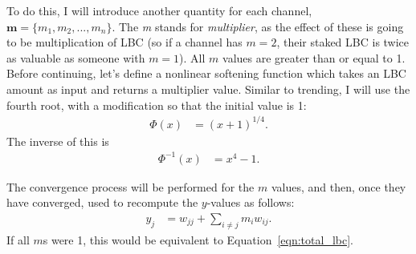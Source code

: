 \documentclass[a4paper, 12pt]{article}
\begin{document}
To do this, I will introduce another quantity for each channel,
$\boldsymbol{m} = \{m_1, m_2, ..., m_n\}$. The {\em m} stands for
{\em multiplier}, as the effect of these is going to be multiplication of LBC
(so if a channel has $m=2$, their staked LBC is twice as valuable as someone
with $m=1$). All $m$ values are greater than or equal to 1.
Before continuing, let's define a nonlinear softening function which takes
an LBC amount as input and returns a multiplier value. Similar to trending,
I will use the fourth root, with a modification so that the initial value
is 1:
\begin{align}
\Phi(x) &= (x + 1)^{1/4}.
\end{align}
The inverse of this is
\begin{align}
\Phi^{-1}(x) &= x^4 - 1.
\end{align}

The convergence process will be performed for the $m$ values, and then,
once they have converged, used to recompute the $y$-values as follows:
\begin{align}
y_j &= w_{jj} + \sum_{i \neq j} m_i w_{ij}.
\end{align}
If all $m$s were 1, this would be equivalent to Equation~\ref{eqn:total_lbc}.







\end{document}

